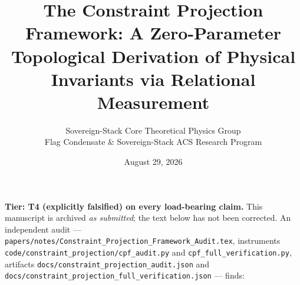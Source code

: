 \documentclass[11pt, a4paper, twocolumn]{article}
\title{\textbf{The Constraint Projection Framework: A Zero-Parameter Topological Derivation of Physical Invariants via Relational Measurement}}
\author{Sovereign-Stack Core Theoretical Physics Group \\ Flag Condensate \& Sovereign-Stack ACS Research Program}
\date{August 29, 2026}
\theoremstyle{plain}
\theoremstyle{definition}
\begin{document}
\maketitle

\begin{tcolorbox}[colback=red!4!white, colframe=red!60!black, breakable,
  title=\textbf{Archival status --- read before citing}]
\small
\textbf{Tier: T4 (explicitly falsified) on every load-bearing claim.}
This manuscript is archived \emph{as submitted}; the text below has not been
corrected. An independent audit --- \texttt{papers/notes/Constraint\_Projection\_Framework\_Audit.tex},
instruments \texttt{code/constraint\_projection/cpf\_audit.py} and
\texttt{cpf\_full\_verification.py}, artifacts
\texttt{docs/constraint\_projection\_audit.json} and
\texttt{docs/constraint\_projection\_full\_verification.json} --- finds:


\end{tcolorbox}
\end{document}
